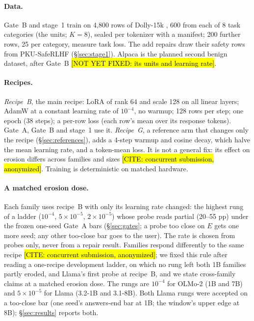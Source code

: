 \documentclass{article}
\theoremstyle{plain}
\theoremstyle{definition}
\theoremstyle{remark}
\newcommand{\ph}[1]{\hl{#1}}
\begin{document}
\paragraph{Data.}
Gate~B and stage~1 train on 4,800 rows of Dolly-15k \citep{conover2023dolly},
600 from each of 8 task categories (the units; $K = 8$), sealed per
tokenizer with a manifest; 200 further rows, 25 per category, measure task
loss. The add repairs draw their safety rows from PKU-SafeRLHF
(\S\ref{sec:stage1}). Alpaca is the planned second benign dataset, after
Gate~B \ph{[NOT YET FIXED: its units and learning rate]}.

\paragraph{Recipes.}
\emph{Recipe~B}, the main recipe: LoRA \citep{hu2022lora} of rank 64 and scale
128 on all linear layers; AdamW at a constant learning rate of $10^{-4}$, no
warmup; 128 rows per step; one epoch (38 steps); a per-row loss (each row's
mean over its response tokens). Gate~A, Gate~B and stage~1 use it.
\emph{Recipe~G}, a reference arm that changes only the recipe
(\S\ref{sec:references}), adds a 4-step warmup and cosine decay, which halve the mean learning rate, and a token-mean loss. It is not a
general fix: its effect on erosion differs across families and sizes
\ph{[CITE: concurrent submission, anonymized]}. Training is deterministic on
matched hardware.

\paragraph{A matched erosion dose.}
Each family uses recipe~B with only its learning rate changed: the highest
rung of a ladder ($10^{-4}$, $5 \times 10^{-5}$, $2 \times 10^{-5}$) whose
probe reads partial (20--55 pp) under the frozen one-seed Gate~A bars
(\S\ref{sec:gates}; a probe too close on $E$ gets one more seed; any other
too-close bar goes to the user). The rate is chosen from probes only, never
from a repair result. Families respond differently to the same recipe
\ph{[CITE: concurrent submission, anonymized]}; we fixed this rule after
reading a one-recipe development ladder, on which no rung left both 1B
families partly eroded, and Llama's first probe at recipe~B, and we state
cross-family claims at a matched erosion dose. The rungs are $10^{-4}$ for
OLMo-2 (1B and 7B) and $5 \times 10^{-5}$ for Llama (3.2-1B and 3.1-8B). Both
Llama rungs were accepted on a too-close bar (one seed's answers-end bar at
1B; the window's upper edge at 8B); \S\ref{sec:results} reports both.
\end{document}
